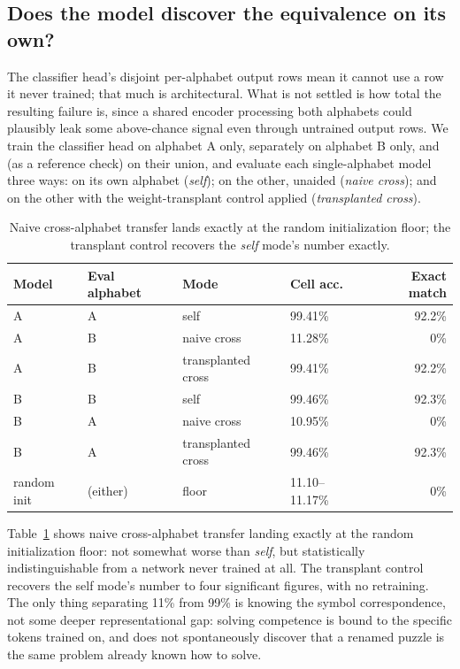 \documentclass{article} %
\begin{document}
\subsection{Does the model discover the equivalence on its own?}
\label{sec:naive}

The classifier head's disjoint per-alphabet output rows mean it cannot
use a row it never trained; that much is architectural. What is not
settled is how total the resulting failure is, since a shared encoder
processing both alphabets could plausibly leak some above-chance signal
even through untrained output rows. We train the classifier head on
alphabet A only, separately on alphabet B only, and (as a reference
check) on their union, and evaluate each single-alphabet model three
ways: on its own alphabet (\emph{self}); on the other, unaided
(\emph{naive cross}); and on the other with the weight-transplant
control applied (\emph{transplanted cross}).

\begin{table}[h]
\centering
\footnotesize
\begin{tabular}{llllr}
\hline
Model & Eval alphabet & Mode & Cell acc. & Exact match \\
\hline
A & A & self & 99.41\% & 92.2\% \\
A & B & naive cross & 11.28\% & 0\% \\
A & B & transplanted cross & 99.41\% & 92.2\% \\
B & B & self & 99.46\% & 92.3\% \\
B & A & naive cross & 10.95\% & 0\% \\
B & A & transplanted cross & 99.46\% & 92.3\% \\
random init & (either) & floor & 11.10--11.17\% & 0\% \\
\hline
\end{tabular}
\caption{Naive cross-alphabet transfer lands exactly at the random
initialization floor; the transplant control recovers the \emph{self} mode's number exactly.}
\label{tab:naive}
\end{table}

Table~\ref{tab:naive} shows naive cross-alphabet transfer landing
exactly at the random initialization floor: not somewhat worse than
\emph{self}, but statistically indistinguishable from a network never
trained at all. The transplant control recovers the self mode's number
to four significant figures, with no retraining. The only thing
separating 11\% from 99\% is knowing the symbol correspondence, not some
deeper representational gap: solving competence is bound to the specific
tokens trained on, and does not spontaneously discover that a renamed
puzzle is the same problem already known how to solve.
\end{document}

